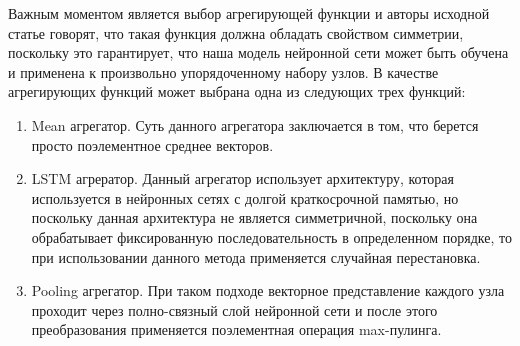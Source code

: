 Важным моментом является выбор агрегирующей функции и авторы исходной статье говорят, что такая функция должна обладать свойством симметрии, поскольку это гарантирует, что наша модель нейронной сети может быть обучена и применена к произвольно упорядоченному набору узлов. В качестве агрегирующих функций может выбрана одна из следующих трех функций:
\begin{enumerate}
\item Mean агрегатор. Суть данного агрегатора заключается в том, что берется просто поэлементное среднее векторов.
\item LSTM агрератор. Данный агрегатор использует архитектуру, которая используется в нейронных сетях с долгой краткосрочной памятью, но поскольку данная архитектура не является симметричной, поскольку она обрабатывает фиксированную последовательность в определенном порядке, то при использовании данного метода применяется случайная перестановка.
\item Pooling агрегатор.  При таком подходе векторное представление каждого узла проходит через полно-связный слой нейронной сети и после этого преобразования применяется поэлементная операция max-пулинга.
\end{enumerate}



\clearpage